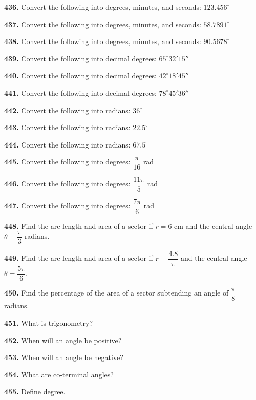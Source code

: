 \documentclass[11pt]{article}
\begin{document}
\bigskip
\noindent\textbf{436.} Convert the following into degrees, minutes, and seconds: $123.456^{\circ}$

\bigskip
\noindent\textbf{437.} Convert the following into degrees, minutes, and seconds: $58.7891^{\circ}$

\bigskip
\noindent\textbf{438.} Convert the following into degrees, minutes, and seconds: $90.5678^{\circ}$

\bigskip
\noindent\textbf{439.} Convert the following into decimal degrees: $65^{\circ}32'15''$

\bigskip
\noindent\textbf{440.} Convert the following into decimal degrees: $42^{\circ}18'45''$

\bigskip
\noindent\textbf{441.} Convert the following into decimal degrees: $78^{\circ}45'36''$

\bigskip
\noindent\textbf{442.} Convert the following into radians: $36^{\circ}$

\bigskip
\noindent\textbf{443.} Convert the following into radians: $22.5^{\circ}$

\bigskip
\noindent\textbf{444.} Convert the following into radians: $67.5^{\circ}$

\bigskip
\noindent\textbf{445.} Convert the following into degrees: $\dfrac{\pi}{16}$ rad

\bigskip
\noindent\textbf{446.} Convert the following into degrees: $\dfrac{11\pi}{5}$ rad

\bigskip
\noindent\textbf{447.} Convert the following into degrees: $\dfrac{7\pi}{6}$ rad

\bigskip
\noindent\textbf{448.} Find the arc length and area of a sector if $r=6$ cm and the central angle $\theta=\dfrac{\pi}{3}$ radians.

\bigskip
\noindent\textbf{449.} Find the arc length and area of a sector if $r=\dfrac{4.8}{\pi}$ and the central angle $\theta=\dfrac{5\pi}{6}$.

\bigskip
\noindent\textbf{450.} Find the percentage of the area of a sector subtending an angle of $\dfrac{\pi}{8}$ radians.

\bigskip
\noindent\textbf{451.} What is trigonometry?

\bigskip
\noindent\textbf{452.} When will an angle be positive?

\bigskip
\noindent\textbf{453.} When will an angle be negative?

\bigskip
\noindent\textbf{454.} What are co-terminal angles?

\bigskip
\noindent\textbf{455.} Define degree.
\end{document}
